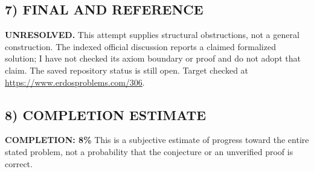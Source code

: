 \subsection*{7) FINAL AND REFERENCE}
\textbf{UNRESOLVED.} This attempt supplies structural obstructions, not a
general construction. The indexed official discussion reports a claimed
formalized solution; I have not checked its axiom boundary or proof and
do not adopt that claim. The saved repository status is still open.
Target checked at \url{https://www.erdosproblems.com/306}.

\subsection*{8) COMPLETION ESTIMATE}
\textbf{COMPLETION: 8\%}
This is a subjective estimate of progress toward the entire stated problem, not a probability that the conjecture or an unverified proof is correct.
